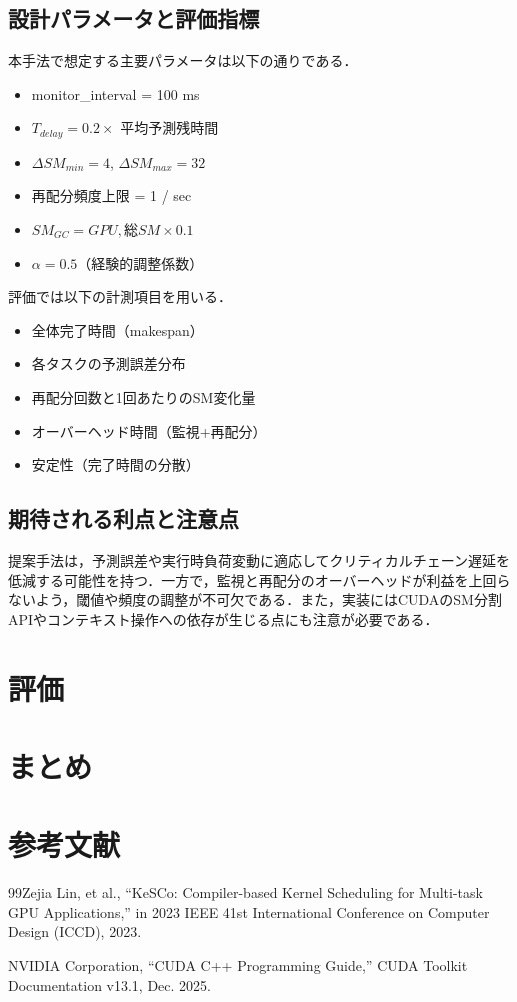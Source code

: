 \subsection{設計パラメータと評価指標}本手法で想定する主要パラメータは以下の通りである．\begin{itemize}\item monitor_interval = 100 ms\item $T_{delay} = 0.2 \times$ 平均予測残時間\item $\Delta SM_{min} = 4$, $\Delta SM_{max} = 32$\item 再配分頻度上限 = 1 / sec\item $SM_{GC} = GPU,総SM \times 0.1$\item $\alpha = 0.5$（経験的調整係数）\end{itemize}評価では以下の計測項目を用いる．\begin{itemize}\item 全体完了時間（makespan）\item 各タスクの予測誤差分布\item 再配分回数と1回あたりのSM変化量\item オーバーヘッド時間（監視+再配分）\item 安定性（完了時間の分散）\end{itemize}

\subsection{期待される利点と注意点}提案手法は，予測誤差や実行時負荷変動に適応してクリティカルチェーン遅延を低減する可能性を持つ．一方で，監視と再配分のオーバーヘッドが利益を上回らないよう，閾値や頻度の調整が不可欠である．また，実装にはCUDAのSM分割APIやコンテキスト操作への依存が生じる点にも注意が必要である．

\section{評価}\section{まとめ}\section{参考文献}\begin{thebibliography}{99}Zejia Lin, et al., ``KeSCo: Compiler-based Kernel Scheduling for Multi-task GPU Applications,'' in 2023 IEEE 41st International Conference on Computer Design (ICCD), 2023.

NVIDIA Corporation, ``CUDA C++ Programming Guide,'' CUDA Toolkit Documentation v13.1, Dec. 2025.\end{thebibliography}




